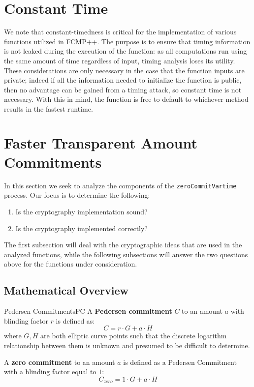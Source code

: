 \documentclass[12pt,titlepage,table]{article}
\begin{document}
\section{Constant Time}

\indent \indent We note that constant-timedness is critical for the implementation of various functions utilized in FCMP++. The purpose is to ensure that timing information is not leaked during the execution of the function: as all computations run using the same amount of time regardless of input, timing analysis loses its utility. These considerations are only necessary in the case that the function inputs are private; indeed if all the information needed to initialize the function is public, then no advantage can be gained from a timing attack, so constant time is not necessary. With this in mind, the function is free to default to whichever method results in the fastest runtime.

\newpage
\section{Faster Transparent Amount Commitments}
In this section we seek to analyze the components of the \verb+zeroCommitVartime+ process. Our focus is to determine the following:
\begin{enumerate}
\item Is the cryptography implementation sound?
\item Is the cryptography implemented correctly?
\end{enumerate}
The first subsection will deal with the cryptographic ideas that are used in the analyzed functions, while the following subsections will answer the two questions above for the functions under consideration.

\subsection{Mathematical Overview}
\begin{df}{Pedersen Commitments}{PC}
A \textbf{Pedersen commitment} $C$ to an amount $a$ with blinding factor $r$ is defined as:
$$C = r \cdot G + a \cdot H$$
where $G,H$ are both elliptic curve points such that the discrete logarithm relationship between them is unknown and presumed to be difficult to determine.

\medskip
A \textbf{zero commitment} to an amount $a$ is defined as a Pedersen Commitment with a blinding factor equal to $1$:
$$C_{zero} = 1 \cdot G + a \cdot H$$
\end{df}
\end{document}
